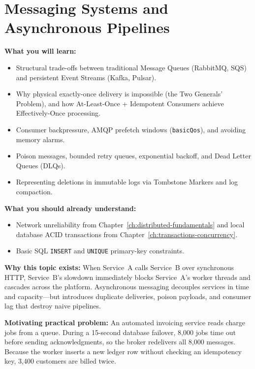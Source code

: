 \chapter{Messaging Systems and Asynchronous Pipelines}
\label{ch:messaging-systems}

\begin{chaptergoalsbox}
\textbf{What you will learn:}
\begin{itemize}[leftmargin=12pt]
  \item Structural trade-offs between traditional Message Queues (RabbitMQ, SQS) and persistent Event Streams (Kafka, Pulsar).
  \item Why physical exactly-once delivery is impossible (the Two Generals' Problem), and how At-Least-Once + Idempotent Consumers achieve Effectively-Once processing.
  \item Consumer backpressure, AMQP prefetch windows (\texttt{basicQos}), and avoiding memory alarms.
  \item Poison messages, bounded retry queues, exponential backoff, and Dead Letter Queues (DLQs).
  \item Representing deletions in immutable logs via Tombstone Markers and log compaction.
\end{itemize}

\textbf{What you should already understand:}
\begin{itemize}[leftmargin=12pt]
  \item Network unreliability from Chapter~\ref{ch:distributed-fundamentals} and local database ACID transactions from Chapter~\ref{ch:transactions-concurrency}.
  \item Basic SQL \texttt{INSERT} and \texttt{UNIQUE} primary-key constraints.
\end{itemize}

\textbf{Why this topic exists:}
When Service~A calls Service~B over synchronous HTTP, Service~B's slowdown immediately blocks Service~A's worker threads and cascades across the platform. Asynchronous messaging decouples services in time and capacity---but introduces duplicate deliveries, poison payloads, and consumer lag that destroy naive pipelines.

\textbf{Motivating practical problem:}
An automated invoicing service reads charge jobs from a queue. During a 15-second database failover, 8,000 jobs time out before sending acknowledgments, so the broker redelivers all 8,000 messages. Because the worker inserts a new ledger row without checking an idempotency key, 3,400 customers are billed twice.
\end{chaptergoalsbox}

